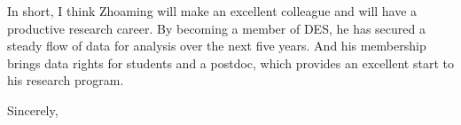 \documentclass[12pt]{letter}
\begin{document}
\begin{letter}{}

In short, I think Zhoaming will make an excellent colleague and will have a
productive research career.  By becoming a member of DES, he has secured
a steady flow of data for analysis over the next five years. And his 
membership brings data rights for students and a postdoc, which provides
an excellent start to his research program.

\closing{Sincerely, }

\end{letter}
\end{document}
